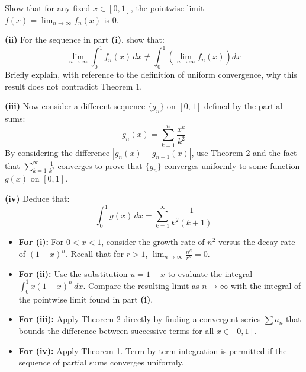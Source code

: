 \begin{problem}
Show that for any fixed $x \in [0, 1]$, the pointwise limit $f(x) = \lim_{n \to \infty} f_n(x)$ is $0$.

\textbf{(ii)} For the sequence in part \textbf{(i)}, show that:
$$\lim_{n \to \infty} \int_0^1 f_n(x) \, dx \neq \int_0^1 \left( \lim_{n \to \infty} f_n(x) \right) dx$$
Briefly explain, with reference to the definition of uniform convergence, why this result does not contradict Theorem 1.

\textbf{(iii)} Now consider a different sequence $\{g_n\}$ on $[0, 1]$ defined by the partial sums:
$$g_n(x) = \sum_{k=1}^n \frac{x^k}{k^2}$$
By considering the difference $|g_n(x) - g_{n-1}(x)|$, use Theorem 2 and the fact that $\sum_{k=1}^\infty \frac{1}{k^2}$ converges to prove that $\{g_n\}$ converges uniformly to some function $g(x)$ on $[0, 1]$.

\textbf{(iv)} Deduce that:
$$\int_0^1 g(x) \, dx = \sum_{k=1}^\infty \frac{1}{k^2(k+1)}$$

\end{problem}

\begin{hint}
\begin{itemize}
    \item \textbf{For (i):} For $0 < x < 1$, consider the growth rate of $n^2$ versus the decay rate of $(1-x)^n$. Recall that for $r > 1$, $\lim_{n \to \infty} \frac{n^k}{r^n} = 0$.
    \item \textbf{For (ii):} Use the substitution $u = 1-x$ to evaluate the integral $\int_0^1 x(1-x)^n \, dx$. Compare the resulting limit as $n \to \infty$ with the integral of the pointwise limit found in part \textbf{(i)}.
    \item \textbf{For (iii):} Apply Theorem 2 directly by finding a convergent series $\sum a_n$ that bounds the difference between successive terms for all $x \in [0, 1]$.
    \item \textbf{For (iv):} Apply Theorem 1. Term-by-term integration is permitted if the sequence of partial sums converges uniformly.
\end{itemize}
\end{hint}

